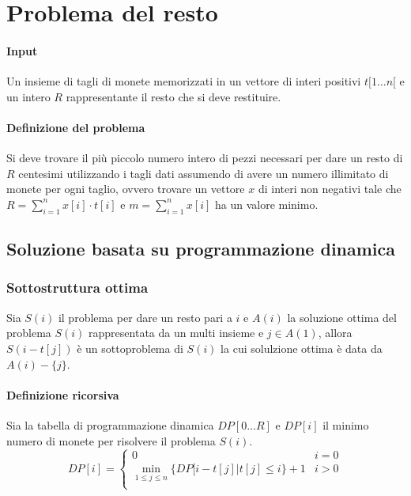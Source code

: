 \section{Problema del resto}
\paragraph{Input}
Un insieme di tagli di monete memorizzati in un vettore di interi positivi $t[1\dots n[$ e un intero $R$ rappresentante il resto che si deve restituire.
\paragraph{Definizione del problema}
Si deve trovare il pi\`u piccolo numero intero di pezzi necessari per dare un resto di $R$ centesimi utilizzando i tagli dati assumendo di avere un numero illimitato di monete per ogni 
taglio, ovvero trovare un vettore $x$ di interi non negativi tale che $R=\sum\limits_{i = 1}^nx[i]\cdot t[i]$ e $m=\sum\limits_{i = 1}^nx[i]$ ha un valore minimo.
\subsection{Soluzione basata su programmazione dinamica}
\subsubsection{Sottostruttura ottima}
Sia $S(i)$ il problema per dare un resto pari a $i$ e $A(i)$ la soluzione ottima del problema $S(i)$ rappresentata da un multi insieme e $j\in A(1)$, allora $S(i-t[j])$ \`e un 
sottoproblema di $S(i)$ la cui solulzione ottima \`e data da $A(i)-\{j\}$. 
\paragraph{Definizione ricorsiva}
Sia la tabella di programmazione dinamica $DP[0\dots R]$ e $DP[i]$ il minimo numero di monete per risolvere il problema $S(i)$.
$$DP[i] = \begin{cases}
	0 & i = 0 \\
	\min\limits_{1\le j\le n}\{DP[i-t[j] | t[j]\le i\} + 1 & i>0\\
\end{cases}$$
